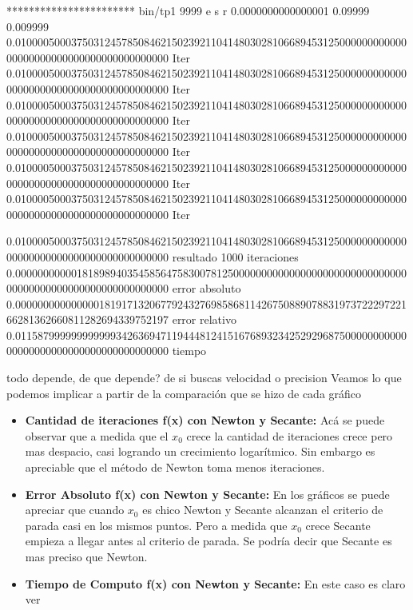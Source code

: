 *********************** bin/tp1 9999 e s r 0.0000000000000001 0.09999 0.009999
0.010000500037503124578508462150239211041480302810668945312500000000000000000000000000000000000000000 Iter
0.010000500037503124578508462150239211041480302810668945312500000000000000000000000000000000000000000 Iter
0.010000500037503124578508462150239211041480302810668945312500000000000000000000000000000000000000000 Iter
0.010000500037503124578508462150239211041480302810668945312500000000000000000000000000000000000000000 Iter
0.010000500037503124578508462150239211041480302810668945312500000000000000000000000000000000000000000 Iter
0.010000500037503124578508462150239211041480302810668945312500000000000000000000000000000000000000000 Iter

0.010000500037503124578508462150239211041480302810668945312500000000000000000000000000000000000000000 resultado
1000 iteraciones
0.000000000001818989403545856475830078125000000000000000000000000000000000000000000000000000000000000 error absoluto
0.000000000000000181917132067792432769858681142675088907883197372229722166281362660811282694339752197 error relativo
0.011587999999999999342636947119444812415167689323425292968750000000000000000000000000000000000000000 tiempo

todo depende, de que depende? de si buscas velocidad o precision
Veamos lo que podemos implicar a partir de la comparación que se hizo de cada gráfico
\begin{itemize}
\item {\bf Cantidad de iteraciones f(x) con Newton y Secante:} Acá se puede observar que a medida que el $x_0$ crece la cantidad de iteraciones crece pero mas despacio, casi logrando un crecimiento logarítmico. Sin embargo es apreciable que el método de Newton toma menos iteraciones.
\item {\bf Error Absoluto f(x) con Newton y Secante:} En los gráficos se puede apreciar que cuando $x_0$ es chico Newton y Secante alcanzan el criterio de parada casi en los mismos puntos. Pero a medida que $x_0$ crece Secante empieza a llegar antes al criterio de parada. Se podría decir que Secante es mas preciso que Newton.
\item {\bf Tiempo de Computo f(x) con Newton y Secante:} En este caso es claro ver  

\end{itemize}



